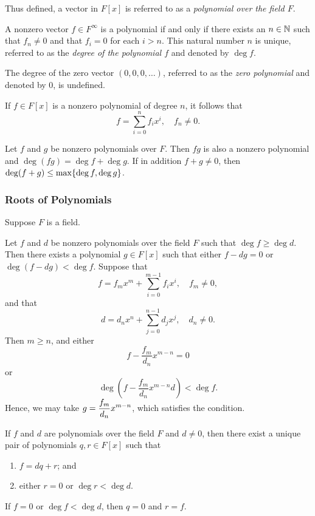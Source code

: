   Thus defined, a vector in \(F[x]\) is referred to as a \emph{polynomial over the field \(F\)}.
\Edf

A nonzero vector \(f \in F^\infty\) is a polynomial if and only if there exists an \(n \in \mathbb{N}\) such that \(f_n
\neq 0\) and that \(f_i = 0\) for each \(i > n\). This natural number \(n\) is unique, referred to as the \emph{degree
of the polynomial \(f\)} and denoted by \(\deg f\).

The degree of the zero vector \((0, 0, 0, \ldots)\), referred to as the \emph{zero polynomial} and denoted by \(0\), is
undefined.

If \(f \in F[x]\) is a nonzero polynomial of degree \(n\), it follows that
\[
  f = \sum_{i = 0}^n f_i x^i, \quad f_n \neq 0.
\]

Let \(f\) and \(g\) be nonzero polynomials over \(F\). Then \(f g\) is also a nonzero polynomial and \(\deg (f g)
= \deg f + \deg g\). If in addition \(f + g \neq 0\), then \(\deg (f + g) \leq \max\{\deg f, \deg g\}\).

\subsubsection{Roots of Polynomials}

Suppose \(F\) is a field.

\Blm
  \label{lm00}
  Let \(f\) and \(d\) be nonzero polynomials over the field \(F\) such that \(\deg f \geq \deg d\). Then there exists a
  polynomial \(g \in F[x]\) such that either \(f - d g = 0\) or \(\deg (f - d g) < \deg f\).
\Elm
\Bpr
  Suppose that
  \[
    f = f_m x^m + \sum_{i = 0}^{m - 1} f_i x^i, \quad f_m \neq 0,
  \]
  and that
  \[
    d = d_n x^n + \sum_{j = 0}^{n - 1} d_j x^j, \quad d_n \neq 0.
  \]
  Then \(m \geq n\), and either
  \[
    f - \frac{f_m}{d_n} x^{m - n} = 0
  \]
  or
  \[
    \deg \left(f - \frac{f_m}{d_n} x^{m - n} d\right) < \deg f.
  \]
  Hence, we may take \(\displaystyle g = \frac{f_m}{d_n} x^{m - n}\), which satisfies the condition.
\Epr

\Bth
  \label{th00}
  If \(f\) and \(d\) are polynomials over the field \(F\) and \(d \neq 0\), then there exist a unique pair of
  polynomials \(q, r \in F[x]\) such that
  \begin{enumerate}
    \item \(f = d q + r\); and
    \item either \(r = 0\) or \(\deg r < \deg d\).
  \end{enumerate}
\Eth
\Bpr
  If \(f = 0\) or \(\deg f < \deg d\), then \(q = 0\) and \(r = f\).

